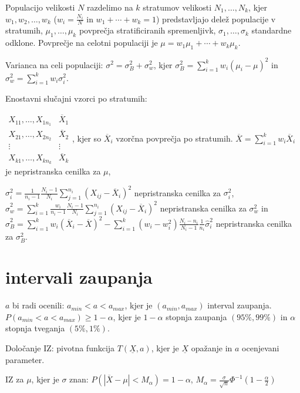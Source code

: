 \documentclass[11pt,a4paper]{amsart}
\theoremstyle{definition} %
\theoremstyle{plain} %
\newcommand{\X}{\underline{X}}
\begin{document}
Populacijo velikosti $N$ razdelimo na $k$ stratumov velikosti $N_1,\ldots,N_k$,
kjer $w_1,w_2,\ldots ,w_k$ ($w_i = \frac{N_i}{N}$ in $w_1 + \cdots + w_k = 1$)
predstavljajo delež populacije v stratumih, $\mu_1,\ldots, \mu_k$ povprečja
stratificiranih spremenljivk, $\sigma_1,\ldots,\sigma_k$ standardne odklone.
Povprečje na celotni populaciji je $\mu = w_1\mu_1 + \cdots + w_k\mu_k$.

Varianca na celi populaciji: $\sigma^2 = \sigma_B^2 + \sigma_w^2$, kjer $\sigma_B^2 = \sum_{i=1}^k w_i(\mu_i - \mu)^2$ in $\sigma_w^2 = \sum_{i=1}^k w_i \sigma_i^2$.

Enostavni slučajni vzorci po stratumih:

$
\begin{matrix}
X_{11},\ldots ,X_{1n_1} & \overline{X}_1 \\
X_{21}, \ldots ,X_{2n_2} & \overline{X}_2 \\
\vdots & \vdots \\
X_{k1},\ldots , X_{kn_k} & \overline{X}_k
\end{matrix}
$,
kjer so $\overline{X}_i$ vzorčna povprečja po stratumih. $\overline{X} =
\sum_{i=1}^k w_i \overline{X}_i$ je nepristranska cenilka za $\mu$,

$\sigma_i^2 = \frac{1}{n_i - 1} \frac{N_i -1}{N_i} \sum_{j=1}^{n_i} (X_{ij} -
\overline{X}_i)^2$ nepristranska cenilka za $\sigma_i^2$, $\widehat{\sigma}_w^2
= \sum_{i=1}^k \frac{w_i}{n_i - 1} \frac{N_i-1}{N_i}\sum_{j=1}^{n_i} (X_{ij} -
\overline{X}_i)^2$  nepristranska cenilka za $\sigma_w^2$ in
$\widehat{\sigma}_B^2 = \sum_{i=1}^k w_i (\overline{X}_i - \overline{X})^2 -
\sum_{i=1}^k (w_i - w_i^2) \frac{N_i - n_i}{N_i - 1}\frac{1}{n_i}
\widehat{\sigma}_i^2$ nepristranska cenilka za $\sigma_B^2$.

\section*{intervali zaupanja}

$a$ bi radi ocenili: $a_{min} < a < a_{max}$, kjer je $(a_{min},a_{max})$
interval zaupanja. $P(a_{min} < a < a_{max}) \geq 1-\alpha$, kjer je $1-\alpha$
stopnja zaupanja $(95\%, 99\%)$ in $\alpha$ stopnja tveganja $(5\%, 1\%)$.

Določanje IZ: pivotna funkcija $T(\X , a)$, kjer je $\X$ opažanje in $a$
ocenjevani parameter.

IZ za $\mu$, kjer je $\sigma$ znan: $P(|\overline{X} - \mu| < M_\alpha ) =
1-\alpha$, $M_\alpha = \frac{\sigma}{\sqrt{n}} \Phi^{-1}(1-\frac{\alpha}{2})$
\end{document}
